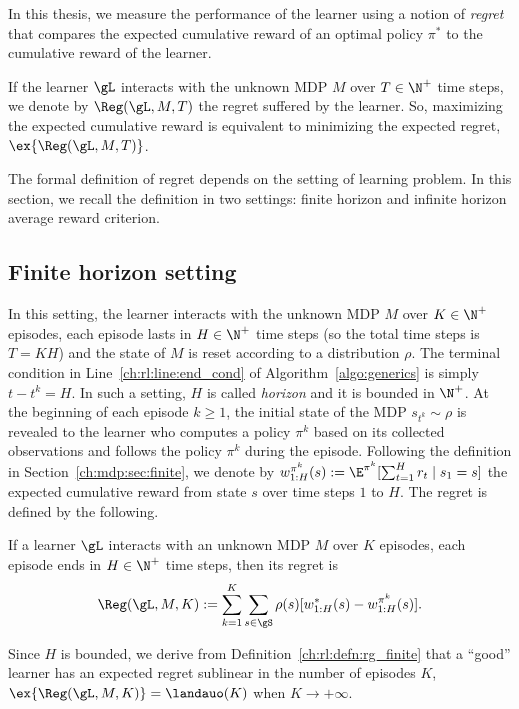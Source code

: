 In this thesis, we measure the performance of the learner using a notion of \emph{regret} that compares the expected cumulative reward of an optimal policy $\pi^*$ to the cumulative reward of the learner. 

If the learner $\gL$ interacts with the unknown MDP $M$ over $T\in\N^+$ time steps, we denote by $\Reg(\gL, M, T)$ the regret suffered by the learner.
So, maximizing the expected cumulative reward is equivalent to minimizing the expected regret, $\ex{\Reg(\gL, M, T)}$.

The formal definition of regret depends on the setting of learning problem.
In this section, we recall the definition in two settings: finite horizon and infinite horizon average reward criterion.

\subsection{Finite horizon setting}
In this setting, the learner interacts with the unknown MDP $M$ over $K\in\N^+$ episodes, each episode lasts in $H\in\N^+$ time steps (so the total time steps is $T=KH$) and the state of $M$ is reset according to a distribution $\rho$.
The terminal condition in Line~\ref{ch:rl:line:end_cond} of Algorithm~\ref{algo:generics} is simply $t-t^k=H$.
In such a setting, $H$ is called \emph{horizon} and it is bounded in $\N^+$.
At the beginning of each episode $k\ge1$, the initial state of the MDP $s_{t^k}\sim\rho$ is revealed to the learner who computes a policy $\pi^k$ based on its collected observations and follows the policy $\pi^k$ during the episode.
Following the definition in Section~\ref{ch:mdp:sec:finite}, we denote by $w^{\pi^k}_{1:H}(s):=\E^{\pi^k}[\sum_{t=1}^{H}r_t \mid s_1=s]$ the expected cumulative reward from state $s$ over time steps $1$ to $H$.
The regret is defined by the following.
\begin{defn}
    If a learner $\gL$ interacts with an unknown MDP $M$ over $K$ episodes, each episode ends in $H\in\N^+$ time steps, then its regret is
    \begin{equation}
        \label{eq:rg_finite}
        \Reg(\gL, M, K):= \sum_{k=1}^K\sum_{s\in\gS}\rho(s)[w^*_{1:H}(s) -w^{\pi^k}_{1:H}(s)].
    \end{equation}
    \label{ch:rl:defn:rg_finite}
\end{defn}
Since $H$ is bounded, we derive from Definition~\ref{ch:rl:defn:rg_finite} that a ``good'' learner has an expected regret sublinear in the number of episodes $K$, $\ex{\Reg(\gL, M, K)}=\landauo(K)$ when $K\to+\infty$.

